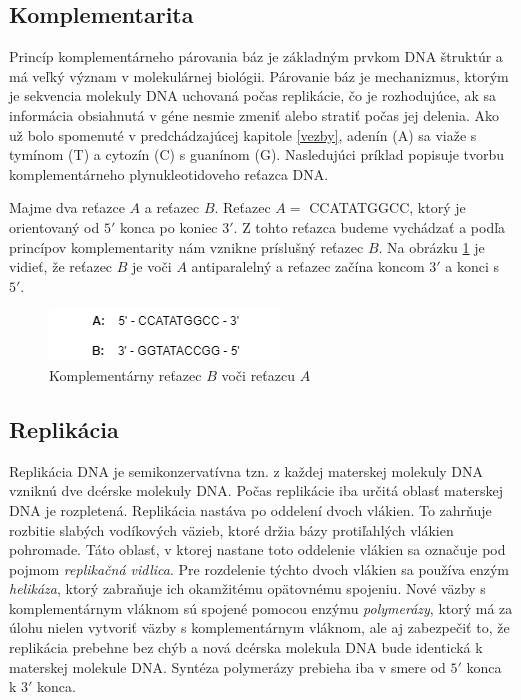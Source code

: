 \subsection{Komplementarita}
Princíp komplementárneho párovania báz je základným prvkom DNA štruktúr a má veľký význam v molekulárnej biológii. Párovanie báz je mechanizmus, ktorým je sekvencia molekuly DNA uchovaná počas replikácie, čo je rozhodujúce, ak sa informácia obsiahnutá v géne nesmie zmeniť alebo stratiť počas jej delenia. Ako už bolo spomenuté v predchádzajúcej kapitole \ref{vezby}, adenín (A) sa viaže s tymínom (T) a cytozín (C) s guanínom (G). Nasledujúci príklad popisuje tvorbu komplementárneho plynukleotidoveho reťazca DNA.

\begin{theorem}
\normalfont Majme dva reťazce $A$ a reťazec $B$. Reťazec $A =$ CCATATGGCC, ktorý je orientovaný od $5'$ konca po koniec $3'$. Z tohto reťazca budeme vychádzať a podľa princípov komplementarity nám vznikne príslušný reťazec $B$. Na obrázku \ref{obrkomp} je vidieť, že reťazec $B$ je voči $A$ antiparalelný a reťazec začína koncom $3'$ a konci s $5'$. 
\begin{figure}[!ht]
\centering
\includegraphics[scale =0.7]{obrazky-figures/kompl.png}
\caption{Komplementárny reťazec $B$ voči reťazcu $A$}
\label{obrkomp}
\end{figure}
\end{theorem}

\subsection{Replikácia}
Replikácia DNA je semikonzervatívna tzn. z každej materskej molekuly DNA vzniknú dve dcérske molekuly DNA. Počas replikácie iba určitá oblasť materskej DNA je rozpletená. Replikácia nastáva po oddelení dvoch vlákien. To zahrňuje rozbitie slabých vodíkových väzieb, ktoré držia bázy protiľahlých vlákien pohromade. Táto oblasť, v ktorej nastane toto oddelenie vlákien sa označuje pod pojmom \textit{replikačná vidlica}. Pre rozdelenie týchto dvoch vlákien sa používa enzým \textit{helikáza}, ktorý zabraňuje ich okamžitému opätovnému spojeniu. Nové väzby s komplementárnym vláknom sú spojené pomocou enzýmu \textit{polymerázy}, ktorý má za úlohu nielen vytvoriť väzby s komplementárnym vláknom, ale aj zabezpečiť to, že replikácia prebehne bez chýb a nová dcérska molekula DNA bude identická k materskej molekule DNA. Syntéza polymerázy prebieha iba v smere od $5'$ konca k $3'$ konca. 


